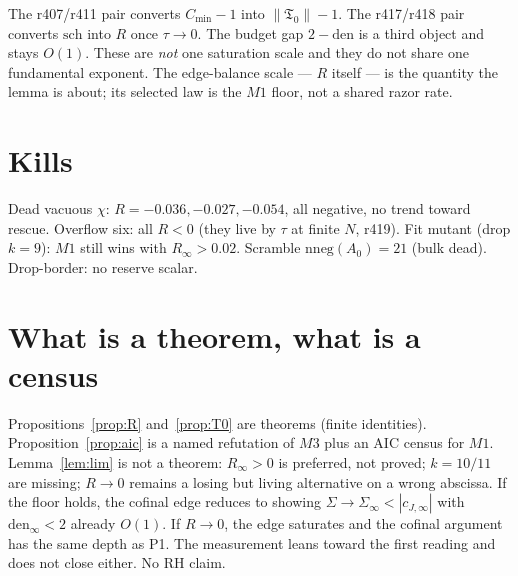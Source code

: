 \documentclass[11pt]{article}
\theoremstyle{remark}
\newcommand{\Tfrak}{\mathfrak{T}}
\begin{document}
The r407/r411 pair converts $C_{\min}-1$ into
$\|\Tfrak_0\|-1$.
The r417/r418 pair converts $\mathrm{sch}$ into $R$
once $\tau\to 0$.
The budget gap $2-\mathrm{den}$ is a third object
and stays $O(1)$.
These are \emph{not} one saturation scale and
they do not share one fundamental exponent.
The edge-balance scale --- $R$ itself --- is the
quantity the lemma is about;
its selected law is the $M1$ floor, not a shared
razor rate.

\section{Kills}\label{sec:kills}

Dead vacuous $\chi$: $R=-0.036,-0.027,-0.054$,
all negative, no trend toward rescue.
Overflow six: all $R<0$ (they live by $\tau$ at
finite $N$, r419).
Fit mutant (drop $k=9$): $M1$ still wins with
$R_\infty>0.02$.
Scramble $\mathrm{nneg}(A_0)=21$ (bulk dead).
Drop-border: no reserve scalar.

\section{What is a theorem, what is a census}\label{sec:honest}

Propositions~\ref{prop:R} and~\ref{prop:T0} are
theorems (finite identities).
Proposition~\ref{prop:aic} is a named refutation of
$M3$ plus an AIC census for $M1$.
Lemma~\ref{lem:lim} is not a theorem:
$R_\infty>0$ is preferred, not proved;
$k=10/11$ are missing;
$R\to 0$ remains a losing but living alternative
on a wrong abscissa.
If the floor holds, the cofinal edge reduces to
showing $\Sigma\to\Sigma_\infty<|c_{J,\infty}|$
with $\mathrm{den}_\infty<2$ already $O(1)$.
If $R\to 0$, the edge saturates and the
cofinal argument has the same depth as P1.
The measurement leans toward the first reading
and does not close either.
No RH claim.
\end{document}
